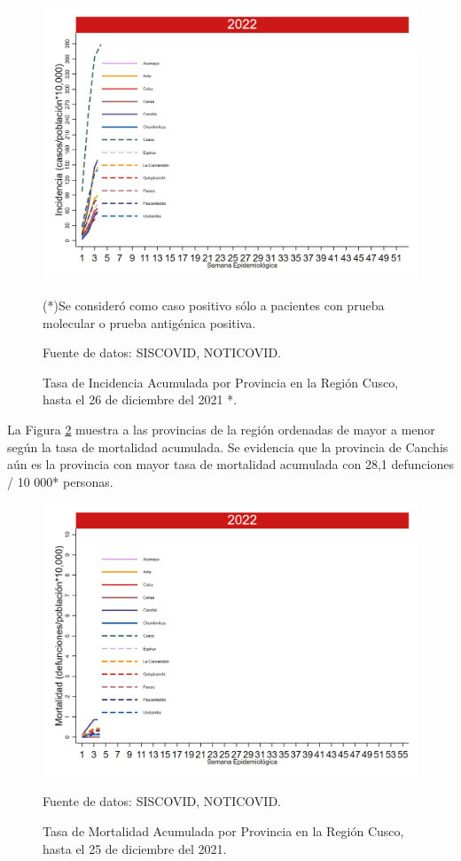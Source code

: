 \documentclass[12pt,a4paper,openany]{book}
\begin{document}
\begin{figure}[!htpb]
	\caption{Tasa de Incidencia Acumulada por Provincia en la Región Cusco, hasta el 26 de diciembre del 2021 *. }\label{fig:incidencia_provincias}
	\begin{center}
		\includegraphics[width=0.75\linewidth]{../figuras/incidencia_provincial_2022.png}
	\end{center}
	{\footnotesize {(*)Se consideró como caso positivo sólo a pacientes con prueba molecular o prueba antigénica positiva. 
			
	Fuente de datos: SISCOVID, NOTICOVID.}}
\end{figure}


La Figura \ref{fig:mortalidad_ordenada} muestra a las provincias de la región ordenadas de mayor a menor según la tasa de mortalidad acumulada. Se evidencia que la provincia de Canchis aún es la provincia con mayor tasa de mortalidad acumulada con 28,1 defunciones / 10 000* personas.  

\begin{figure}[h]
	\caption{Tasa de Mortalidad Acumulada por Provincia en la Región Cusco, hasta el 25 de diciembre del 2021. }\label{fig:mortalidad_ordenada}
	\begin{center}
		\includegraphics[width=0.65\linewidth]{../figuras/mortalidad_provincial_2022.png}
	\end{center}
	{\footnotesize {Fuente de datos: SISCOVID, NOTICOVID.}}
\end{figure}
\end{document}
